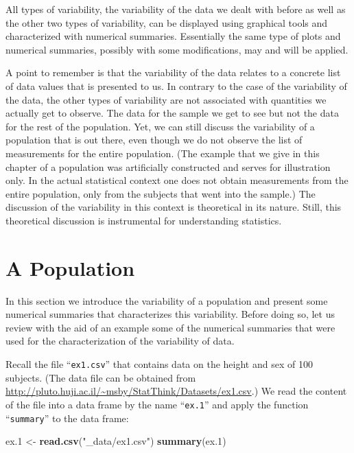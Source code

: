 \documentclass[]{krantz}
\makeatletter
\newenvironment{Shaded}{\begin{snugshade}}{\end{snugshade}}
\newcommand{\FloatTok}[1]{\textcolor[rgb]{0.00,0.00,0.81}{#1}}
\newcommand{\KeywordTok}[1]{\textcolor[rgb]{0.13,0.29,0.53}{\textbf{#1}}}
\newcommand{\NormalTok}[1]{#1}
\newcommand{\StringTok}[1]{\textcolor[rgb]{0.31,0.60,0.02}{#1}}
\newenvironment{kframe}{%
\medskip{}
\setlength{\fboxsep}{.8em}
 \def\at@end@of@kframe{}%
 \ifinner\ifhmode%
  \def\at@end@of@kframe{\end{minipage}}%
  \begin{minipage}{\columnwidth}%
 \fi\fi%
 \def\FrameCommand##1{\hskip\@totalleftmargin \hskip-\fboxsep
 \colorbox{shadecolor}{##1}\hskip-\fboxsep
     \hskip-\linewidth \hskip-\@totalleftmargin \hskip\columnwidth}%
 \MakeFramed {\advance\hsize-\width
   \@totalleftmargin\z@ \linewidth\hsize
   \@setminipage}}%
 {\par\unskip\endMakeFramed%
 \at@end@of@kframe}
\renewenvironment{Shaded}{\begin{kframe}}{\end{kframe}}
\theoremstyle{definition}
\theoremstyle{definition}
\theoremstyle{definition}
\theoremstyle{remark}
\makeatother
\begin{document}
All types of variability, the variability of the data we dealt with
before as well as the other two types of variability, can be displayed
using graphical tools and characterized with numerical summaries.
Essentially the same type of plots and numerical summaries, possibly
with some modifications, may and will be applied.

A point to remember is that the variability of the data relates to a
concrete list of data values that is presented to us. In contrary to the
case of the variability of the data, the other types of variability are
not associated with quantities we actually get to observe. The data for
the sample we get to see but not the data for the rest of the
population. Yet, we can still discuss the variability of a population
that is out there, even though we do not observe the list of
measurements for the entire population. (The example that we give in
this chapter of a population was artificially constructed and serves for
illustration only. In the actual statistical context one does not obtain
measurements from the entire population, only from the subjects that
went into the sample.) The discussion of the variability in this context
is theoretical in its nature. Still, this theoretical discussion is
instrumental for understanding statistics.

\hypertarget{a-population}{%
\section{A Population}\label{a-population}}

In this section we introduce the variability of a population and present
some numerical summaries that characterizes this variability. Before
doing so, let us review with the aid of an example some of the numerical
summaries that were used for the characterization of the variability of
data.

Recall the file ``\texttt{ex1.csv}'' that contains data on the height and sex of
100 subjects. (The data file can be obtained from
\url{http://pluto.huji.ac.il/~msby/StatThink/Datasets/ex1.csv}.) We read the
content of the file into a data frame by the name ``\texttt{ex.1}'' and apply the
function ``\texttt{summary}'' to the data frame:

\begin{Shaded}
\begin{Highlighting}[]
\NormalTok{ex}\FloatTok{.1}\NormalTok{ <-}\StringTok{ }\KeywordTok{read.csv}\NormalTok{(}\StringTok{"_data/ex1.csv"}\NormalTok{)}
\KeywordTok{summary}\NormalTok{(ex}\FloatTok{.1}\NormalTok{)}
\end{Highlighting}
\end{Shaded}
\end{document}

